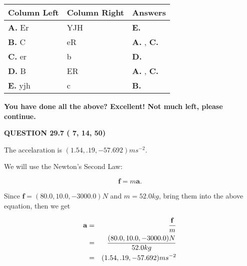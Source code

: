 \documentclass[12pt]{article}
\begin{document}
  
 
 
\noindent{}
  
  
\begin{tabular}{|l|l|l|}
 \hline
 Column Left & Column Right  & Answers       \\ 
 \hline
{\textbf{\large{
A.}}}
Er
  & 
YJH
 & 
{\textbf{\large{
E.}}}
 \\ 
 \hline
{\textbf{\large{
B.}}}
C
  & 
eR
 & 
{\textbf{\large{
A.}}}
, 
{\textbf{\large{
C.}}}
 \\ 
 \hline
{\textbf{\large{
C.}}}
er
  & 
b
 & 
{\textbf{\large{
D.}}}
 \\ 
 \hline
{\textbf{\large{
D.}}}
B
  & 
ER
 & 
{\textbf{\large{
A.}}}
, 
{\textbf{\large{
C.}}}
 \\ 
 \hline
{\textbf{\large{
E.}}}
yjh
  & 
c
 & 
{\textbf{\large{
B.}}}
 \\ 
 \hline
 \end{tabular}
  
  
 
 
 
 
   
   
\vspace{0.3in}
{\textbf{\LARGE{You have done all the above? Excellent! Not much left, please continue.}}}
\vspace{0.3in}
   
   
  
\vspace{0.2in}
  
{\textbf{\Large{QUESTION
29.7 
 (          7,         14,         50)
}}}
  
  
 
 
\noindent{}
 
 
  The accelaration is $  %
(
1.54,
.19,
-57.692)
ms^{-2} $.
 
 
 
 
 
 
\noindent{}

We will use the Newton's Second Law:
 
\[
\mathbf{f}=m\mathbf{a}.
\]
 
Since $\mathbf{f}= %
(80.0 , 10.0 , -3000.0) N$
and $m= %
52.0kg$, bring them into the above equation, then we get
 
\begin{eqnarray*}
\mathbf{a}&=&\frac{\mathbf{f}}m  \\
&=&\frac{ %
(80.0 , 10.0 , -3000.0) N}{ %
52.0kg}  \\
&=& %
(1.54 , .19 , -57.692) ms^{-2}
\end{eqnarray*}
 
\end{document}
